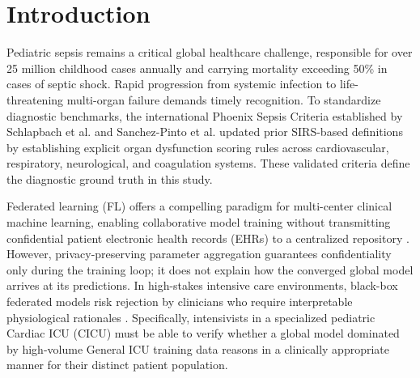 \documentclass[sigconf,review,anonymous]{acmart}
\begin{document}


\maketitle

\section{Introduction}\label{sec:intro}

Pediatric sepsis remains a critical global healthcare challenge, responsible for over 25 million childhood cases annually and carrying mortality exceeding 50\% in cases of septic shock. Rapid progression from systemic infection to life-threatening multi-organ failure demands timely recognition. To standardize diagnostic benchmarks, the international Phoenix Sepsis Criteria established by Schlapbach et al. \cite{schlapbach2024phoenix} and Sanchez-Pinto et al. \cite{sanchezpinto2024phoenix} updated prior SIRS-based definitions \cite{goldstein2005sirs} by establishing explicit organ dysfunction scoring rules across cardiovascular, respiratory, neurological, and coagulation systems. These validated criteria define the diagnostic ground truth in this study.

Federated learning (FL) offers a compelling paradigm for multi-center clinical machine learning, enabling collaborative model training without transmitting confidential patient electronic health records (EHRs) to a centralized repository \cite{mcmahan2017fedavg,li2020fedprox}. However, privacy-preserving parameter aggregation guarantees confidentiality only during the training loop; it does not explain how the converged global model arrives at its predictions. In high-stakes intensive care environments, black-box federated models risk rejection by clinicians who require interpretable physiological rationales \cite{athukorala2026explainable}. Specifically, intensivists in a specialized pediatric Cardiac ICU (CICU) must be able to verify whether a global model dominated by high-volume General ICU training data reasons in a clinically appropriate manner for their distinct patient population.
\end{document}
